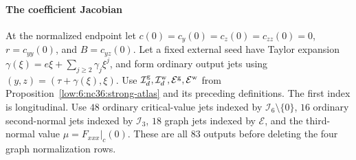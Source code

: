 \documentclass[11pt]{amsart}
\theoremstyle{definition}
\theoremstyle{remark}
\numberwithin{equation}{section}
\begin{document}
\paragraph{The coefficient Jacobian}

At the normalized endpoint let $c(0)=c_y(0)=c_z(0)=c_{zz}(0)=0$, $r=c_{yy}(0)$, and $B=c_{yz}(0)$. Let a fixed external seed have Taylor expansion $\gamma(\xi)=e\xi+\sum_{j\ge2}\gamma_j\xi^j$, and form ordinary output jets using $(y,z)=(\tau+\gamma(\xi),\xi)$. Use $\mathcal I_d^{\rm g},\mathcal I_d^{\rm w},\mathcal E^{\rm g},\mathcal E^{\rm w}$ from Proposition~\ref{low:6:nc36:strong-atlas} and its preceding definitions.
The first index is longitudinal. Use $48$ ordinary critical-value jets indexed by $\mathcal I_6\setminus\{0\}$, $16$ ordinary second-normal jets indexed by $\mathcal I_3$, $18$ graph jets indexed by $\mathcal E$, and the third-normal value $\mu=F_{xxx}|_c(0)$. These are all $83$ outputs before deleting the four graph normalization rows.
\end{document}
